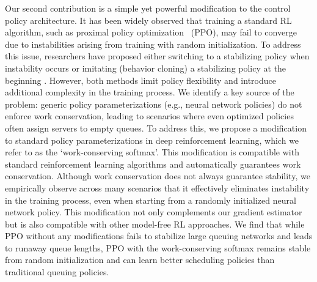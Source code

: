 Our second contribution is a simple yet powerful modification to the control policy architecture. It has been widely observed that training a standard RL algorithm, such as proximal policy optimization~\cite{schulman2017proximal} (PPO), may fail to converge due to instabilities arising from training with random initialization. To address this issue, researchers have proposed either switching to a stabilizing policy when instability occurs \citep{liu2022rl} or imitating (behavior cloning) a stabilizing policy at the beginning \citep{dai2022queueing}. However, both methods limit policy flexibility and introduce additional complexity in the training process. We identify a key source of the problem: generic policy parameterizations (e.g., neural network policies) do not enforce work conservation, leading to scenarios where even optimized policies often assign servers to empty queues. 
To address this, we propose a modification to standard  policy parameterizations in deep reinforcement learning,
which we refer to as the `work-conserving softmax'. This modification is compatible with standard reinforcement learning algorithms and automatically guarantees work conservation. Although work conservation does not always guarantee stability, we empirically observe across many scenarios that it effectively eliminates instability in the training process, even when starting from a randomly initialized neural network policy.
This modification not only complements our gradient estimator but is also compatible with other model-free RL approaches. We find that while PPO without any modifications fails to stabilize large queuing networks and leads to runaway queue lengths, PPO with the work-conserving softmax remains stable from random initialization and can learn better scheduling policies than traditional queuing policies.

